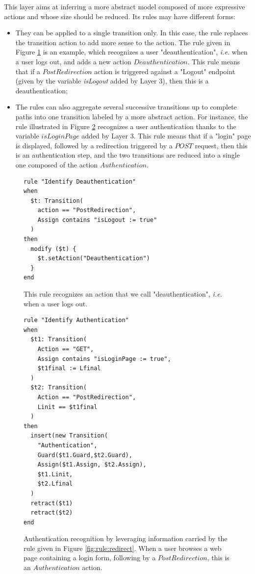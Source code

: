 This layer aims at inferring a more abstract model composed of
more expressive actions and whose size should be reduced. Its
rules may have different forms:

\begin{itemize}
\item They can be applied to a single transition only. In this
case, the rule replaces the transition action to add more sense
to the action. The rule given in Figure \ref{fig:rule:deauth} is
an example, which recognizes a user "deauthentication",
\emph{i.e.} when a user logs out, and adds a new action
$Deauthentication$. This rule means that if a $PostRedirection$
action is triggered against a "Logout" endpoint (given by the
variable \textit{isLogout} added by Layer 3), then this is a
deauthentication;

\item The rules can also aggregate several successive transitions
up to complete paths into one transition labeled by a more
abstract action. For instance, the rule illustrated in Figure
\ref{fig:rule:auth} recognizes a user authentication thanks to
the variable $isLoginPage$ added by Layer 3. This rule means that
if a "login" page is displayed, followed by a redirection
triggered by a $POST$ request, then this is an authentication
step, and the two transitions are reduced into a single one
composed of the action $Authentication$.
\end{itemize}

\begin{figure}[h]
\begin{framed}
\begin{BVerbatim}
rule "Identify Deauthentication"
when
  $t: Transition(
    action == "PostRedirection",
    Assign contains "isLogout := true"
  )
then
  modify ($t) {
    $t.setAction("Deauthentication")
  }
end
\end{BVerbatim}
\end{framed}

    \caption{This rule recognizes an action that we call
    "deauthentication", \emph{i.e.} when a user logs out.}
    \label{fig:rule:deauth}
\end{figure}

\begin{figure}[h]
\begin{framed}
\begin{BVerbatim}
rule "Identify Authentication"
when
  $t1: Transition(
    Action == "GET",
    Assign contains "isLoginPage := true",
    $t1final := Lfinal
  )
  $t2: Transition(
    Action == "PostRedirection",
    Linit == $t1final
  )
then
  insert(new Transition(
    "Authentication",
    Guard($t1.Guard,$t2.Guard),
    Assign($t1.Assign, $t2.Assign),
    $t1.Linit,
    $t2.Lfinal
  )
  retract($t1)
  retract($t2)
end
\end{BVerbatim}
\end{framed}

    \caption{Authentication recognition by leveraging information
    carried by the rule given in Figure \ref{fig:rule:redirect}.
    When a user browses a web page containing a login form,
    following by a $PostRedirection$, this is an $Authentication$
    action.}
    \label{fig:rule:auth}
\end{figure}

